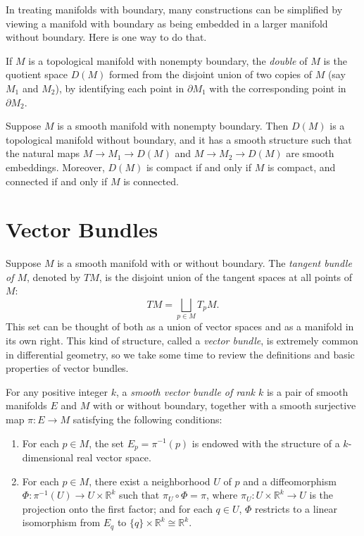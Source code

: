 In treating manifolds with boundary, many constructions can be simplified by viewing a manifold with boundary as being embedded in a larger manifold without boundary. Here is one way to do that.

If $M$ is a topological manifold with nonempty boundary, the \emph{double} of $M$ is the quotient space $D(M)$ formed from the disjoint union of two copies of $M$ (say $M_1$ and $M_2$), by identifying each point in $\partial M_1$ with the corresponding point in $\partial M_2$.

\begin{proposition}
\label{prop:double-manifold}
Suppose $M$ is a smooth manifold with nonempty boundary. Then $D(M)$ is a topological manifold without boundary, and it has a smooth structure such that the natural maps $M \to M_1 \to D(M)$ and $M \to M_2 \to D(M)$ are smooth embeddings. Moreover, $D(M)$ is compact if and only if $M$ is compact, and connected if and only if $M$ is connected.
\end{proposition}

\section{Vector Bundles}

Suppose $M$ is a smooth manifold with or without boundary. The \emph{tangent bundle of $M$}, denoted by $TM$, is the disjoint union of the tangent spaces at all points of $M$:
\[
TM = \bigsqcup_{p \in M} T_p M.
\]
This set can be thought of both as a union of vector spaces and as a manifold in its own right. This kind of structure, called a \emph{vector bundle}, is extremely common in differential geometry, so we take some time to review the definitions and basic properties of vector bundles.

For any positive integer $k$, a \emph{smooth vector bundle of rank $k$} is a pair of smooth manifolds $E$ and $M$ with or without boundary, together with a smooth surjective map $\pi : E \to M$ satisfying the following conditions:
\begin{enumerate}
\item[(i)] For each $p \in M$, the set $E_p = \pi^{-1}(p)$ is endowed with the structure of a $k$-dimensional real vector space.
\item[(ii)] For each $p \in M$, there exist a neighborhood $U$ of $p$ and a diffeomorphism $\Phi : \pi^{-1}(U) \to U \times \mathbb{R}^k$ such that $\pi_U \circ \Phi = \pi$, where $\pi_U : U \times \mathbb{R}^k \to U$ is the projection onto the first factor; and for each $q \in U$, $\Phi$ restricts to a linear isomorphism from $E_q$ to $\{q\} \times \mathbb{R}^k \cong \mathbb{R}^k$.
\end{enumerate}


